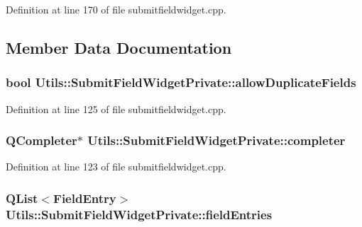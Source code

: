 \-Definition at line 170 of file submitfieldwidget.\-cpp.



\subsection{\-Member \-Data \-Documentation}
\hypertarget{struct_utils_1_1_submit_field_widget_private_a1ca5838c86c52dfc9b8870b8a6d294bb}{
\subsubsection[{allow\-Duplicate\-Fields}]{\setlength{\rightskip}{0pt plus 5cm}bool {\bf \-Utils\-::\-Submit\-Field\-Widget\-Private\-::allow\-Duplicate\-Fields}}}\label{struct_utils_1_1_submit_field_widget_private_a1ca5838c86c52dfc9b8870b8a6d294bb}


\-Definition at line 125 of file submitfieldwidget.\-cpp.

\hypertarget{struct_utils_1_1_submit_field_widget_private_ac12876e8b7b00d8ad515b9d4511f9514}{
\subsubsection[{completer}]{\setlength{\rightskip}{0pt plus 5cm}\-Q\-Completer$\ast$ {\bf \-Utils\-::\-Submit\-Field\-Widget\-Private\-::completer}}}\label{struct_utils_1_1_submit_field_widget_private_ac12876e8b7b00d8ad515b9d4511f9514}


\-Definition at line 123 of file submitfieldwidget.\-cpp.

\hypertarget{struct_utils_1_1_submit_field_widget_private_a7f0075b86997f84922636913eb8ed081}{
\subsubsection[{field\-Entries}]{\setlength{\rightskip}{0pt plus 5cm}\-Q\-List$<${\bf \-Field\-Entry}$>$ {\bf \-Utils\-::\-Submit\-Field\-Widget\-Private\-::field\-Entries}}}\label{struct_utils_1_1_submit_field_widget_private_a7f0075b86997f84922636913eb8ed081}


